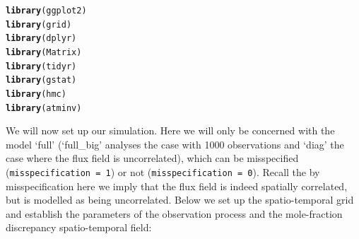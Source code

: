 \documentclass[a4paper,11pt]{article}\usepackage[]{graphicx}\usepackage[]{color}
\makeatletter
\newcommand{\hlstd}[1]{\textcolor[rgb]{0.345,0.345,0.345}{#1}}%
\newcommand{\hlkwd}[1]{\textcolor[rgb]{0.737,0.353,0.396}{\textbf{#1}}}%
\newenvironment{kframe}{%
 \def\at@end@of@kframe{}%
 \ifinner\ifhmode%
  \def\at@end@of@kframe{\end{minipage}}%
  \begin{minipage}{\columnwidth}%
 \fi\fi%
 \def\FrameCommand##1{\hskip\@totalleftmargin \hskip-\fboxsep
 \colorbox{shadecolor}{##1}\hskip-\fboxsep
     \hskip-\linewidth \hskip-\@totalleftmargin \hskip\columnwidth}%
 \MakeFramed {\advance\hsize-\width
   \@totalleftmargin\z@ \linewidth\hsize
   \@setminipage}}%
 {\par\unskip\endMakeFramed%
 \at@end@of@kframe}
\newenvironment{knitrout}{}{} %
\makeatother
\begin{document}
\begin{knitrout}
\color{fgcolor}\begin{kframe}
\begin{alltt}
\hlkwd{library}\hlstd{(ggplot2)}
\hlkwd{library}\hlstd{(grid)}
\hlkwd{library}\hlstd{(dplyr)}
\hlkwd{library}\hlstd{(Matrix)}
\hlkwd{library}\hlstd{(tidyr)}
\hlkwd{library}\hlstd{(gstat)}
\hlkwd{library}\hlstd{(hmc)}
\hlkwd{library}\hlstd{(atminv)}
\end{alltt}
\end{kframe}
\end{knitrout}

We will now set up our simulation. Here we will only be concerned with the model `full' (`full\_big' analyses the case with 1000 observations and `diag' the case where the flux field is uncorrelated), which can be misspecified (\texttt{misspecification = 1}) or not (\texttt{misspecification = 0}). Recall the by misspecification here we imply that the flux field is indeed spatially correlated, but is modelled as being uncorrelated. Below we set up the spatio-temporal grid and establish the parameters of the observation process and the mole-fraction discrepancy spatio-temporal field:
\end{document}
